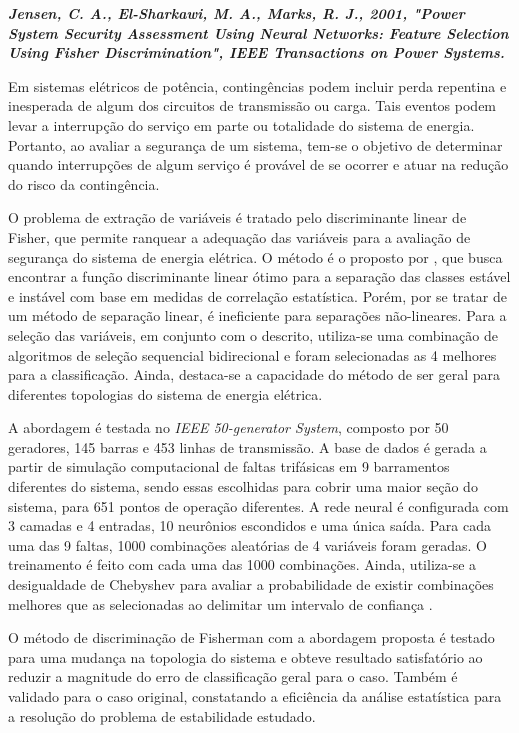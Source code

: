 \documentclass[12pt,oneside,a4paper,chapter=TITLE,section=TITLE,sumario=tradicional,english,brazil]{abntex2}
\begin{document}
\textbf{\textit{Jensen, C. A., El-Sharkawi, M. A., Marks, R. J., 2001, "Power System Security Assessment Using Neural Networks: Feature Selection Using Fisher Discrimination", IEEE Transactions on Power Systems.}}\par 
	Em sistemas elétricos de potência, contingências podem incluir perda repentina e inesperada de algum dos circuitos de transmissão ou carga. Tais eventos podem levar a interrupção do serviço em parte ou totalidade do sistema de energia. Portanto, ao avaliar a segurança de um sistema, tem-se o objetivo de determinar quando interrupções de algum serviço é provável de se ocorrer e atuar na redução do risco da contingência.\par 
	O problema de extração de variáveis é tratado pelo discriminante linear de Fisher, que permite ranquear a adequação das variáveis para a avaliação de segurança do sistema de energia elétrica. O método é o proposto por \textcite{weerasooriya1991}, que busca encontrar a função discriminante linear ótimo para a separação das classes estável e instável com base em medidas de correlação estatística. Porém, por se tratar de um método de separação linear, é ineficiente para separações não-lineares. Para a seleção das variáveis, em conjunto com o descrito, utiliza-se uma combinação de algoritmos de seleção sequencial bidirecional e foram selecionadas as 4 melhores para a classificação. Ainda, destaca-se a capacidade do método de ser geral para diferentes topologias do sistema de energia elétrica.\par
	A abordagem é testada no \textit{IEEE 50-generator System}, composto por 50 geradores, 145 barras e 453 linhas de transmissão. A base de dados é gerada a partir de simulação computacional de faltas trifásicas em 9 barramentos diferentes do sistema, sendo essas escolhidas para cobrir uma maior seção do sistema, para 651 pontos de operação diferentes. A rede neural é configurada com 3 camadas e 4 entradas, 10 neurônios escondidos e uma única saída. Para cada uma das 9 faltas, 1000 combinações aleatórias de 4 variáveis foram geradas. O treinamento é feito com cada uma das 1000 combinações. Ainda, utiliza-se a desigualdade de Chebyshev para avaliar a probabilidade de existir combinações melhores que as selecionadas ao delimitar um intervalo de confiança \cites{larson1982}{leon2008}.\par
	O método de discriminação de Fisherman com a abordagem proposta é testado para uma mudança na topologia do sistema e obteve resultado satisfatório ao reduzir a magnitude do erro de classificação geral para o caso. Também é validado para o caso original, constatando a eficiência da análise estatística para a resolução do problema de estabilidade estudado.\par
\end{document}

